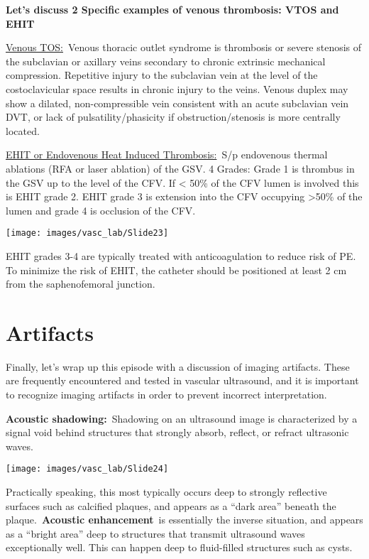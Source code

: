 \documentclass[
]{book}
\begin{document}
\textbf{Let's discuss 2 Specific examples of venous thrombosis: VTOS and
EHIT}

\uline{Venous TOS:}~Venous thoracic outlet syndrome is thrombosis
or severe stenosis of the subclavian or axillary veins secondary to
chronic extrinsic mechanical compression. Repetitive injury to the
subclavian vein at the level of the costoclavicular space results in
chronic injury to the veins. Venous duplex may show a dilated,
non-compressible vein consistent with an acute subclavian vein DVT, or
lack of pulsatility/phasicity if obstruction/stenosis is more centrally
located.

\uline{EHIT or Endovenous Heat Induced Thrombosis:}~S/p endovenous
thermal ablations (RFA or laser ablation) of the GSV. 4 Grades: Grade 1
is thrombus in the GSV up to the level of the CFV. If \textless{} 50\% of the CFV
lumen is involved this is EHIT grade 2. EHIT grade 3 is extension into
the CFV occupying \textgreater50\% of the lumen and grade 4 is occlusion of the
CFV.

\texttt{[image: images/vasc\_lab/Slide23]}

EHIT grades 3-4 are typically treated with anticoagulation to reduce
risk of PE. To minimize the risk of EHIT, the catheter should be
positioned at least 2 cm from the saphenofemoral junction.

\hypertarget{artifacts}{%
\section{Artifacts}\label{artifacts}}

Finally, let's wrap up this episode with a discussion of imaging
artifacts. These are frequently encountered and tested in vascular
ultrasound, and it is important to recognize imaging artifacts in order
to prevent incorrect interpretation.

\textbf{Acoustic shadowing:}~Shadowing on an ultrasound image is
characterized by a signal void behind structures that strongly absorb,
reflect, or refract ultrasonic waves.

\texttt{[image: images/vasc\_lab/Slide24]}

Practically speaking, this most typically occurs deep to strongly
reflective surfaces such as calcified plaques, and appears as a ``dark
area'' beneath the plaque.~\textbf{Acoustic enhancement}~is essentially the
inverse situation, and appears as a ``bright area'' deep to structures
that transmit ultrasound waves exceptionally well. This can happen deep
to fluid-filled structures such as cysts.
\end{document}
